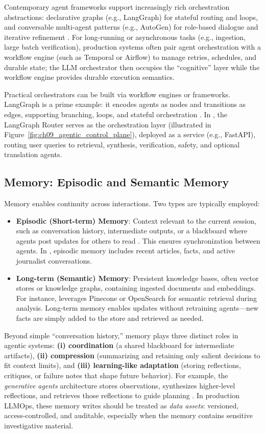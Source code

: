 Contemporary agent frameworks support increasingly rich orchestration abstractions: declarative graphs (e.g., LangGraph) for stateful routing and loops, and conversable multi-agent patterns (e.g., AutoGen) for role-based dialogue and iterative refinement \cite{Wu2023AutoGen}.
For long-running or asynchronous tasks (e.g., ingestion, large batch verification), production systems often pair agent orchestration with a workflow engine (such as Temporal or Airflow) to manage retries, schedules, and durable state; the LLM orchestrator then occupies the ``cognitive'' layer while the workflow engine provides durable execution semantics.

Practical orchestrators can be built via workflow engines or frameworks. LangGraph is a prime example: it encodes agents as nodes and transitions as edges, supporting branching, loops, and stateful orchestration \cite{langchain}. In \ishtar{}, the LangGraph Router serves as the orchestration layer (illustrated in Figure~\ref{fig:ch09_agentic_control_plane}), deployed as a service (e.g., FastAPI), routing user queries to retrieval, synthesis, verification, safety, and optional translation agents.  

\subsection{Memory: Episodic and Semantic Memory}
Memory enables continuity across interactions. Two types are typically employed:  

\begin{itemize}
    \item \textbf{Episodic (Short-term) Memory}: Context relevant to the current session, such as conversation history, intermediate outputs, or a blackboard where agents post updates for others to read \cite{emergentmind2}. This ensures synchronization between agents. In \ishtar{}, episodic memory includes recent articles, facts, and active journalist conversations.  
    \item \textbf{Long-term (Semantic) Memory}: Persistent knowledge bases, often vector stores or knowledge graphs, containing ingested documents and embeddings. For instance, \ishtar{} leverages Pinecone or OpenSearch for semantic retrieval during analysis. Long-term memory enables updates without retraining agents—new facts are simply added to the store and retrieved as needed.  
\end{itemize}

Beyond simple ``conversation history,'' memory plays three distinct roles in agentic systems:
\textbf{(i) coordination} (a shared blackboard for intermediate artifacts), \textbf{(ii) compression} (summarizing and retaining only salient decisions to fit context limits), and \textbf{(iii) learning-like adaptation} (storing reflections, critiques, or failure notes that shape future behavior).
For example, the \emph{generative agents} architecture stores observations, synthesizes higher-level reflections, and retrieves those reflections to guide planning \cite{Park2023GenerativeAgents}.
In production LLMOps, these memory writes should be treated as \emph{data assets}: versioned, access-controlled, and auditable, especially when the memory contains sensitive investigative material.

